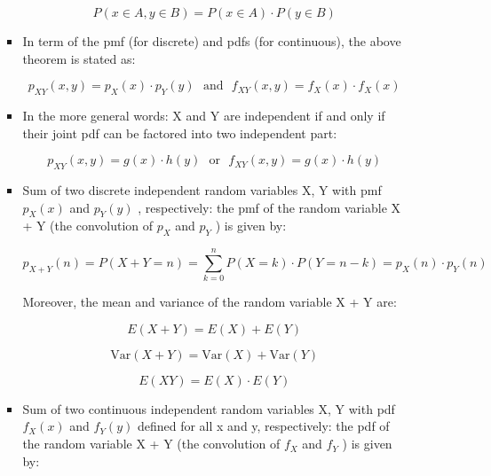 \documentclass[12pt]{report}
\renewcommand{\_}{\kern-1.5pt\textunderscore\kern-1.5pt}
\begin{document}
\begin{itemize}
\begin{itemize}
\begin{itemize}
 \[ P \left( x \in A,y \in B \right) =P \left( x \in A \right)  \cdot P \left( y \in B \right)  \] \par

	\item In term of the pmf (for discrete) and pdfs (for continuous), the above theorem is stated as: \par

 \[ p_{XY} \left( x,y \right) =p_{X} \left( x \right)  \cdot p_{Y} \left( y \right) ~~~\mathrm{and~~~}f_{XY} \left( x,y \right) =f_{X} \left( x \right)  \cdot f_{X} \left( x \right)  \] \par

	\item In the more general words: X and Y are independent if and only if their joint pdf can be factored into two independent part:\par

 \[ p_{XY} \left( x,y \right) =g \left( x \right)  \cdot h \left( y \right) ~~~\mathrm{or~~~}f_{XY} \left( x,y \right) =g \left( x \right)  \cdot h \left( y \right)  \] \par

	\item Sum of two discrete independent random variables X, Y with pmf  \( p_{X} \left( x \right)  \)  and  \( p_{Y} \left( y \right)  \) , respectively: the pmf of the random variable X + Y (the convolution of  \( p_{X} \)  and  \( p_{Y} \) ) is given by:\par

 \[ p_{X+Y} \left( n \right) =P \left( X+Y=n \right) = \sum _{k=0}^{n}P \left( X=k \right)  \cdot P \left( Y=n-k \right) =p_{X} \left( n \right)  \cdot p_{Y} \left( n \right)  \] \par

Moreover, the mean and variance of the random variable X + Y are:\par

 \[ E \left( X+Y \right) =E \left( X \right) +E \left( Y \right)  \] \par

 \[ \mathrm{Var} \left( X+Y \right) =\mathrm{Var} \left( X \right) +\mathrm{Var} \left( Y \right)  \] \par

 \[ E \left( XY \right) =E \left( X \right)  \cdot E \left( Y \right)  \] \par

	\item Sum of two continuous independent random variables X, Y with pdf  \( f_{X} \left( x \right)  \)  and  \( f_{Y} \left( y \right)  \)  defined for all x and y, respectively: the pdf of the random variable X + Y (the convolution of  \( f_{X} \)  and  \( f_{Y} \) ) is given by:
\end{itemize}
\end{itemize}
\end{itemize}\par
\end{document}
